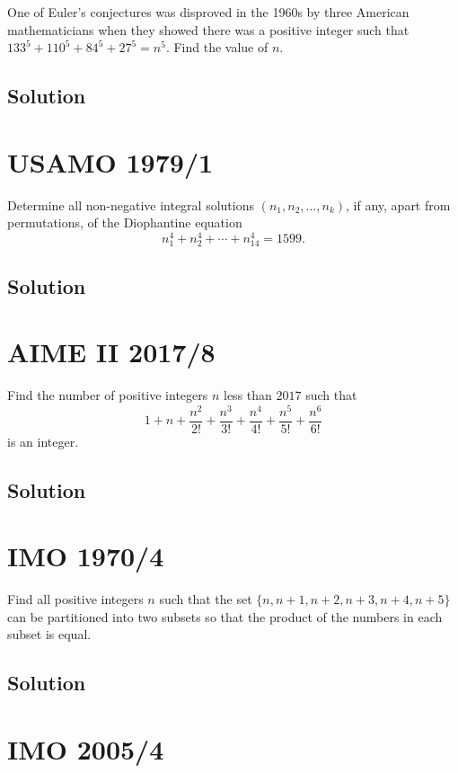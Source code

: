 \documentclass[mast]{lucky}
\begin{document}
One of Euler's conjectures was disproved in the 1960s by three American mathematicians when they showed there was a positive integer such that $133^5+110^5+84^5+27^5=n^{5}$. Find the value of $n$.

\subsection{Solution}

\pagebreak\section{USAMO 1979/1}

Determine all non-negative integral solutions $(n_1, n_2, \dots , n_k)$, if any, apart from permutations, of the Diophantine equation
$$n_1^4 + n_2^4 + \cdots + n_{14}^{4} = 1599.$$

\subsection{Solution}

\pagebreak\section{AIME II 2017/8}

Find the number of positive integers $n$ less than $2017$ such that
\[ 1+n+\frac{n^2}{2!}+\frac{n^3}{3!}+\frac{n^4}{4!}+\frac{n^5}{5!}+\frac{n^6}{6!} \]is an integer.

\subsection{Solution}

\pagebreak\section{IMO 1970/4}

Find all positive integers $n$ such that the set $\{n,n+1,n+2,n+3,n+4,n+5\}$ can be partitioned into two subsets so that the product of the numbers in each subset is equal.

\subsection{Solution}

\pagebreak\section{IMO 2005/4}
\end{document}
